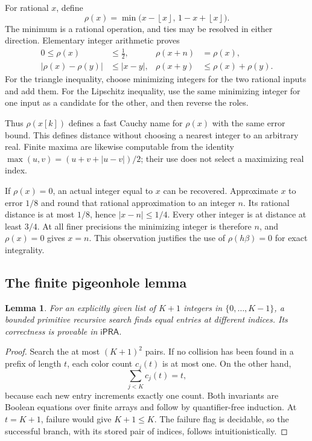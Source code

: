 \documentclass[11pt]{article}
\newtheorem{lemma}[theorem]{Lemma}
\theoremstyle{definition}\newtheorem{definition}[theorem]{Definition}
\theoremstyle{remark}\newtheorem{remark}[theorem]{Remark}
\newcommand{\ipra}{\mathsf{iPRA}}\newcommand{\HA}{\mathsf{HA}}
\newcommand{\floor}[1]{\left\lfloor#1\right\rfloor}
\begin{document}
For rational $x$, define
\[
 \rho(x)=\min\bigl(x-\floor x,\,1-x+\floor x\bigr).
\]
The minimum is a rational operation, and ties may be resolved in either direction. Elementary integer arithmetic proves
\begin{align}
 0\le\rho(x)&\le\tfrac12, & \rho(x+n)&=\rho(x),\label{eq:rho}\\
 |\rho(x)-\rho(y)|&\le|x-y|,&
 \rho(x+y)&\le\rho(x)+\rho(y).
\end{align}
For the triangle inequality, choose minimizing integers for the two rational inputs and add them. For the Lipschitz inequality, use the same minimizing integer for one input as a candidate for the other, and then reverse the roles.

Thus $\rho(x[k])$ defines a fast Cauchy name for $\rho(x)$ with the same error bound. This defines distance without choosing a nearest integer to an arbitrary real. Finite maxima are likewise computable from the identity $\max(u,v)=(u+v+|u-v|)/2$; their use does not select a maximizing real index.

If $\rho(x)=0$, an actual integer equal to $x$ can be recovered. Approximate $x$ to error $1/8$ and round that rational approximation to an integer $n$. Its rational distance is at most $1/8$, hence $|x-n|\le1/4$. Every other integer is at distance at least $3/4$. At all finer precisions the minimizing integer is therefore $n$, and $\rho(x)=0$ gives $x=n$. This observation justifies the use of $\rho(h\beta)=0$ for exact integrality.

\subsection{The finite pigeonhole lemma}

\begin{lemma}\label{lem:php}
For an explicitly given list of $K+1$ integers in $\{0,\ldots,K-1\}$, a bounded primitive recursive search finds equal entries at different indices. Its correctness is provable in $\ipra$.
\end{lemma}
\begin{proof}
Search the at most $(K+1)^2$ pairs. If no collision has been found in a prefix of length $t$, each color count $c_j(t)$ is at most one. On the other hand,
\[
 \sum_{j<K}c_j(t)=t,
\]
because each new entry increments exactly one count. Both invariants are Boolean equations over finite arrays and follow by quantifier-free induction. At $t=K+1$, failure would give $K+1\le K$. The failure flag is decidable, so the successful branch, with its stored pair of indices, follows intuitionistically.
\end{proof}
\end{document}
